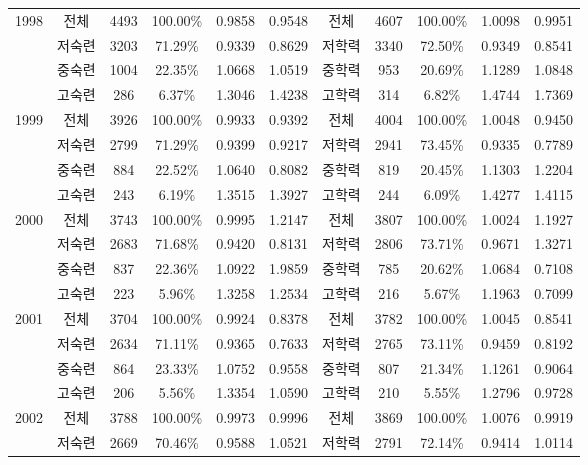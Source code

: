 {\begin{longtable}[htbp]{c|ccccc|ccccc}
    \multirow[t]{4}{*}{1998}  & 전체    & 4493  & 100.00\% & 0.9858 & 0.9548  & 전체    & 4607  & 100.00\% & 1.0098 & 0.9951  \\
    & 저숙련   & 3203  & 71.29\% & 0.9339 & 0.8629 & 저학력   & 3340  & 72.50\% & 0.9349 & 0.8541  \\
    & 중숙련   & 1004  & 22.35\% & 1.0668 & 1.0519 & 중학력   & 953   & 20.69\% & 1.1289 & 1.0848  \\
    & 고숙련   & 286   & 6.37\% & 1.3046 & 1.4238 &  고학력   & 314   & 6.82\% & 1.4744 & 1.7369  \\
    \hline \multirow[t]{4}{*}{1999}  & 전체    & 3926  & 100.00\% & 0.9933 & 0.9392  & 전체    & 4004  & 100.00\% & 1.0048 & 0.9450  \\
    & 저숙련   & 2799  & 71.29\% & 0.9399 & 0.9217 & 저학력   & 2941  & 73.45\% & 0.9335 & 0.7789  \\
    & 중숙련   & 884   & 22.52\% & 1.0640 & 0.8082 & 중학력   & 819   & 20.45\% & 1.1303 & 1.2204  \\
    & 고숙련   & 243   & 6.19\% & 1.3515 & 1.3927 &  고학력   & 244   & 6.09\% & 1.4277 & 1.4115  \\
    \hline \multirow[t]{4}{*}{2000}  & 전체    & 3743  & 100.00\% & 0.9995 & 1.2147  & 전체    & 3807  & 100.00\% & 1.0024 & 1.1927  \\
    & 저숙련   & 2683  & 71.68\% & 0.9420 & 0.8131 & 저학력   & 2806  & 73.71\% & 0.9671 & 1.3271  \\
    & 중숙련   & 837   & 22.36\% & 1.0922 & 1.9859 & 중학력   & 785   & 20.62\% & 1.0684 & 0.7108  \\
    & 고숙련   & 223   & 5.96\% & 1.3258 & 1.2534 &  고학력   & 216   & 5.67\% & 1.1963 & 0.7099  \\
    \hline \multirow[t]{4}{*}{2001}  & 전체    & 3704  & 100.00\% & 0.9924 & 0.8378  & 전체    & 3782  & 100.00\% & 1.0045 & 0.8541  \\
    & 저숙련   & 2634  & 71.11\% & 0.9365 & 0.7633 & 저학력   & 2765  & 73.11\% & 0.9459 & 0.8192  \\
    & 중숙련   & 864   & 23.33\% & 1.0752 & 0.9558 & 중학력   & 807   & 21.34\% & 1.1261 & 0.9064  \\
    & 고숙련   & 206   & 5.56\% & 1.3354 & 1.0590 & 고학력   & 210   & 5.55\% & 1.2796 & 0.9728  \\
    \hline \multirow[t]{4}{*}{2002}  & 전체    & 3788  & 100.00\% & 0.9973 & 0.9996  & 전체    & 3869  & 100.00\% & 1.0076 & 0.9919  \\
    & 저숙련   & 2669  & 70.46\% & 0.9588 & 1.0521 & 저학력   & 2791  & 72.14\% & 0.9414 & 1.0114  \\

\end{longtable}}
